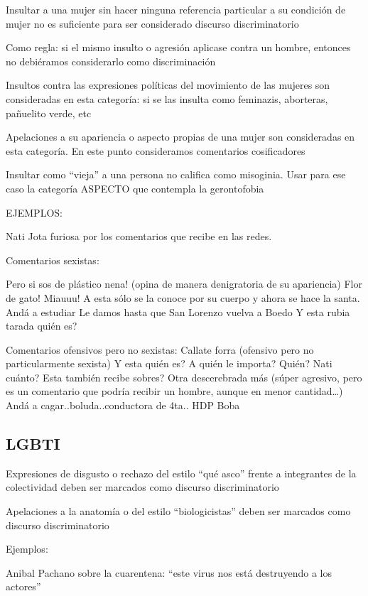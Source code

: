 Insultar a una mujer sin hacer ninguna referencia particular a su condición de mujer no es suficiente para ser considerado discurso discriminatorio

Como regla: si el mismo insulto o agresión aplicase contra un hombre, entonces no debiéramos considerarlo como discriminación


Insultos contra las expresiones políticas del movimiento de las mujeres son consideradas en esta categoría: si se las insulta como feminazis, aborteras, pañuelito verde, etc



Apelaciones a su apariencia o aspecto propias de una mujer son consideradas en esta categoría. En este punto consideramos comentarios cosificadores


Insultar como “vieja” a una persona no califica como misoginia. Usar para ese caso la categoría ASPECTO que contempla la gerontofobia

EJEMPLOS:

Nati Jota furiosa por los comentarios que recibe en las redes.

Comentarios sexistas:

Pero si sos de plástico nena! (opina de manera denigratoria de su apariencia)
Flor de gato!
Miauuu!
A esta sólo se la conoce por su cuerpo y ahora se hace la santa. Andá a estudiar
Le damos hasta que San Lorenzo vuelva a Boedo
Y esta rubia tarada quién es?



Comentarios ofensivos pero no sexistas:
Callate forra (ofensivo pero no particularmente sexista)
Y esta quién es? A quién le importa?
Quién?
Nati cuánto?
Esta también recibe sobres?
Otra descerebrada más (súper agresivo, pero es un comentario que podría recibir un hombre, aunque en menor cantidad…)
Andá a cagar..boluda..conductora de 4ta..
HDP
Boba



\subsection{LGBTI}

Expresiones de disgusto o rechazo del estilo “qué asco” frente a integrantes de la colectividad deben ser marcados como discurso discriminatorio


Apelaciones a la anatomía o del estilo “biologicistas” deben ser marcados como discurso discriminatorio


Ejemplos:

Anibal Pachano sobre la cuarentena: “este virus nos está destruyendo a los actores”


